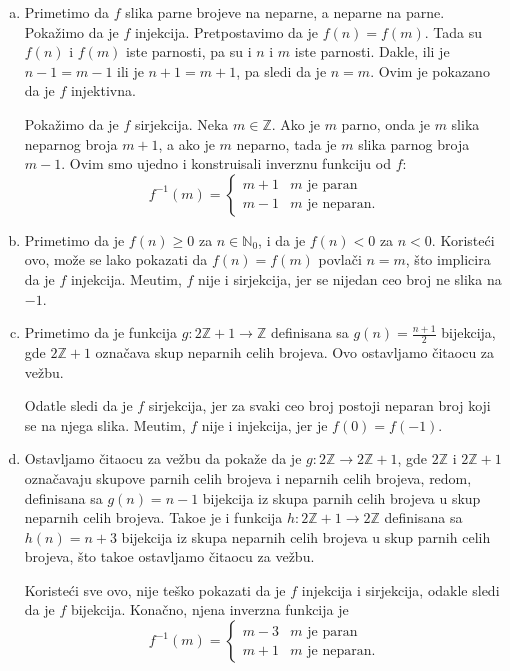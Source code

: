 {{{\begin{enumerate}[(a)]
Funkcija $f$ nije sirjekcija, jer se npr. nijedan ceo broj ne slika na $2$.
\item[(g)] Primetimo da $f$ slika parne brojeve na neparne, a neparne na parne. Poka\v zimo da je $f$ injekcija. Pretpostavimo da je $f(n)=f(m)$. Tada su $f(n)$ i $f(m)$ iste parnosti, pa su i $n$ i $m$ iste parnosti. Dakle, ili je $n-1=m-1$ ili je $n+1=m+1$, pa sledi da je $n=m$. Ovim je pokazano da je $f$ injektivna.

Poka\v zimo da je $f$ sirjekcija. Neka $m\in\mathbb Z$. Ako je $m$ parno, onda je $m$ slika neparnog broja $m+1$, a ako je $m$ neparno, tada je $m$ slika parnog broja $m-1$. Ovim smo ujedno i konstruisali inverznu funkciju od $f$:
\[f^{-1}(m)=\begin{cases}
m+1&m\text{ je paran}\\
m-1&m\text{ je neparan.}
\end{cases}\]
\item[(h)] Primetimo da je $f(n)\geq 0$ za $n\in\mathbb N_0$, i da je $f(n)<0$ za $n<0$. Koriste\' ci ovo, mo\v ze se lako pokazati da $f(n)=f(m)$ povla\v ci $n=m$, \v sto implicira da je $f$ injekcija. Me\dj utim, $f$ nije i sirjekcija, jer se nijedan ceo broj ne slika na $-1$.
\item[(i)] Primetimo da je funkcija $g:2\mathbb Z+1\rightarrow\mathbb Z$ definisana sa $g(n)=\frac{n+1}2$ bijekcija, gde $2\mathbb Z+1$ ozna\v cava skup neparnih celih brojeva. Ovo ostavljamo \v citaocu za ve\v zbu.

Odatle sledi da je $f$ sirjekcija, jer za svaki ceo broj postoji neparan broj koji se na njega slika. Me\dj utim, $f$ nije i injekcija, jer je $f(0)=f(-1)$.
\item[(j)] Ostavljamo \v citaocu za ve\v zbu da poka\v ze da je $g:2\mathbb Z\rightarrow 2\mathbb Z+1$, gde $2\mathbb Z$ i $2\mathbb Z+1$ ozna\v cavaju skupove parnih celih brojeva i neparnih celih brojeva, redom, definisana sa $g(n)=n-1$ bijekcija iz skupa parnih celih brojeva u skup neparnih celih brojeva. Tako\dj e je i funkcija $h:2\mathbb Z+1\rightarrow2\mathbb Z$ definisana sa $h(n)=n+3$ bijekcija iz skupa neparnih celih brojeva u skup parnih celih brojeva, \v sto tako\dj e ostavljamo \v citaocu za ve\v zbu.

Koriste\' ci sve ovo, nije te\v sko pokazati da je $f$ injekcija i sirjekcija, odakle sledi da je $f$ bijekcija. Kona\v cno, njena inverzna funkcija je
\[f^{-1}(m)=\begin{cases}
m-3&m\text{ je paran}\\
m+1&m\text{ je neparan.}
\end{cases}\]
\end{enumerate}
}


}}
